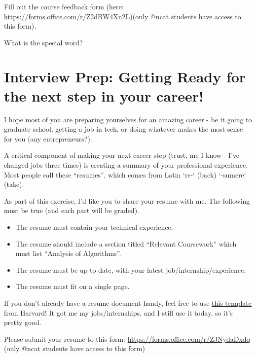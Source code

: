 \documentclass [12pt]{article}
\begin{document}
Fill out the course feedback form (here: \href{https://forms.office.com/r/Z2dBW4Xn2L}{https://forms.office.com/r/Z2dBW4Xn2L})(only @ncat students have access to this form).

What is the special word?


\pagebreak
\section{Interview Prep: Getting Ready for the next step in your career!}
 I hope most of you are preparing yourselves for an amazing career - be it going to graduate school, getting a job in tech, or doing whatever makes the most sense for you (any entrepreneurs?).

A critical component of making your next career step (trust, me I know - I've changed jobs three times) is creating a summary of your professional experience. Most people call these ``resumes'', which comes from Latin `re-` (back) `-sumere` (take).

As part of this exercise, I'd like you to share your resume with me. The following must be true (and each part will be graded).

\begin{itemize}
    \item {} The resume must contain your technical experience.
    \item {} The resume should include a section titled ``Relevant Coursework'' which must list ``Analysis of Algorithms''. 
    \item {} The resume must be up-to-date, with your latest job/internship/experience.
    \item {} The resume must fit on a single page. 
\end{itemize}

If you don't already have a resume document handy, feel free to use \href{http://hwpi.harvard.edu/files/ocs/files/template_bullet.doc}{this template} from Harvard! It got me my jobs/internships, and I still use it today, so it's pretty good.

Please submit your resume to this form: \href{https://forms.office.com/r/ZJNydaDxdq}{https://forms.office.com/r/ZJNydaDxdq} (only @ncat students have access to this form)
\end{document}
